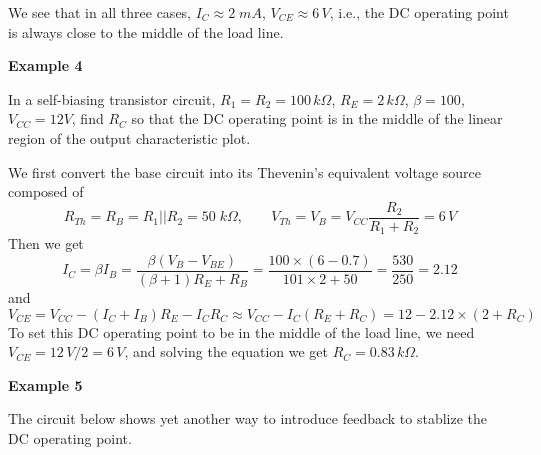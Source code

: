 \documentclass{article}
\begin{document}
We see that in all three cases, $I_C\approx 2\;mA$, 
$V_{CE}\approx 6\,V$, i.e., the DC operating point is always
close to the middle of the load line.

{\bf Example 4}

In a self-biasing transistor circuit, $R_1=R_2=100\,k\Omega$, $R_E=2\,k\Omega$, 
$\beta=100$, $V_{CC}=12V$, find $R_C$ so that the DC operating point is 
in the middle of the linear region of the output characteristic plot.

We first convert the base circuit into its Thevenin's equivalent voltage 
source composed of
\begin{equation} 
  R_{Th}=R_B=R_1||R_2=50\;k\Omega,\;\;\;\;\;\;\;
  V_{Th}=V_B=V_{CC}\frac{R_2}{R_1+R_2}=6\,V 
\end{equation}
Then we get
\begin{equation} 
  I_C=\beta I_B=\frac{\beta(V_B-V_{BE})}{(\beta+1)R_E+R_B}
  =\frac{100\times(6-0.7)}{101\times 2+50}=\frac{530}{250}=2.12
\end{equation}
and
\begin{equation}
  V_{CE}=V_{CC}-(I_C+I_B) R_E-I_CR_C\approx V_{CC}-I_C(R_E+R_C)
  =12-2.12\times (2+R_C)
\end{equation}
To set this DC operating point to be in the middle of the load 
line, we need $V_{CE}=12\,V/2=6\,V$, and solving the equation we 
get $R_C=0.83\,k\Omega$.

{\bf Example 5} 

The circuit below shows yet another way to introduce feedback to 
stablize the DC operating point. 

\end{document}

